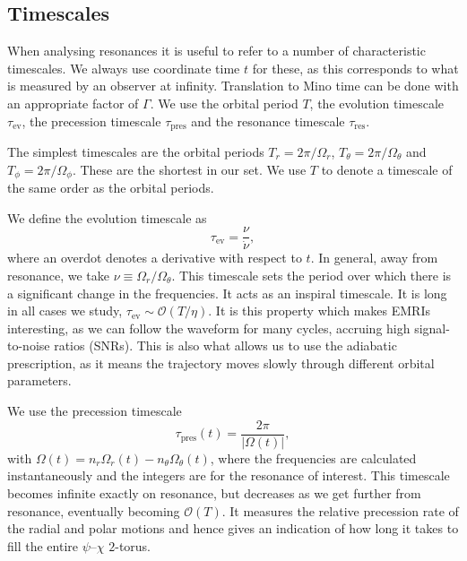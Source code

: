 \documentclass[aps,prd,amsfonts,amssymb,amsmath,nofootinbib,showpacs,superscriptaddress,twocolumn,floatfix]{revtex4-1}
\newcommand{\sub}[1]{\ensuremath{_\mathrm{#1}}}
\newcommand{\order}[1]{\ensuremath{\mathcal{O}({#1})}}
\begin{document}
\subsection{Timescales}\label{sec:res-time}

When analysing resonances it is useful to refer to a number of characteristic timescales.  We always use coordinate time $t$ for these, as this corresponds to what is measured by an observer at infinity. Translation to Mino time can be done with an appropriate factor of $\Gamma$. We use the orbital period $T$, the evolution timescale $\tau\sub{ev}$, the precession timescale $\tau\sub{pres}$ and the resonance timescale $\tau\sub{res}$.

The simplest timescales are the orbital periods $T_r = 2\pi/\Omega_r$, $T_\theta = 2\pi/\Omega_\theta$ and $T_\phi = 2\pi/\Omega_\phi$. These are the shortest in our set. We use $T$ to denote a timescale of the same order as the orbital periods.

We define the evolution timescale as
\begin{equation}
\tau\sub{ev} = \frac{\nu}{\dot{\nu}},
\end{equation}
where an overdot denotes a derivative with respect to $t$. In general, away from resonance, we take $\nu \equiv \Omega_r/\Omega_\theta$. This timescale sets the period over which there is a significant change in the frequencies. It acts as an inspiral timescale. It is long in all cases we study, $\tau\sub{ev} \sim \order{T/\eta}$. It is this property which makes EMRIs interesting, as we can follow the waveform for many cycles, accruing high signal-to-noise ratios (SNRs). This is also what allows us to use the adiabatic prescription, as it means the trajectory moves slowly through different orbital parameters.

We use the precession timescale
\begin{equation}
\tau\sub{pres}(t) = \frac{2\pi}{|\Omega(t)|},
\label{eq:t-pres}
\end{equation}
with $\Omega(t) = n_r \Omega_r(t) - n_\theta \Omega_\theta(t)$, where the frequencies are calculated instantaneously and the integers are for the resonance of interest. This timescale becomes infinite exactly on resonance, but decreases as we get further from resonance, eventually becoming $\order{T}$. It measures the relative precession rate of the radial and polar motions and hence gives an indication of how long it takes to fill the entire $\psi$--$\chi$ $2$-torus.
\end{document}
